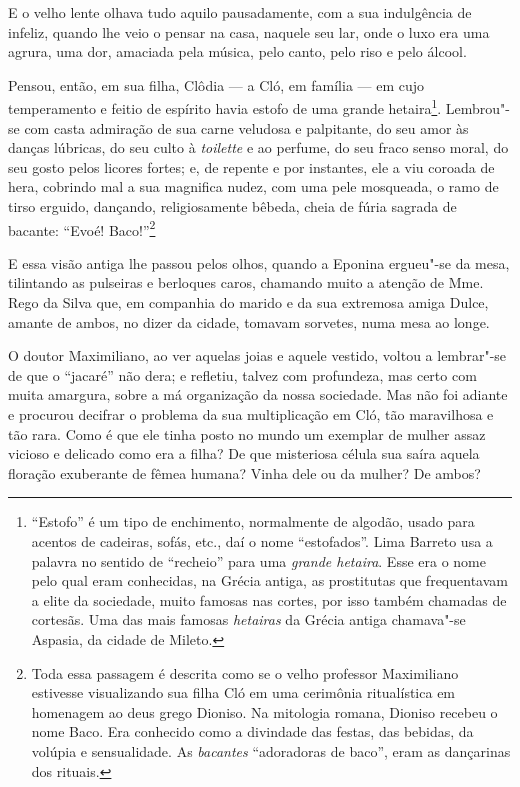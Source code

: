E o velho lente olhava tudo aquilo pausadamente, com a sua indulgência
de infeliz, quando lhe veio o pensar na casa, naquele seu lar, onde o
luxo era uma agrura, uma dor, amaciada pela música, pelo canto, pelo
riso e pelo álcool.

Pensou, então, em sua filha, Clôdia --- a Cló, em família --- em cujo
temperamento e feitio de espírito havia estofo de uma grande
hetaira\footnote{``Estofo'' é um tipo de enchimento, normalmente de
  algodão, usado para acentos de cadeiras, sofás, etc., daí o nome
  ``estofados''. Lima Barreto usa a palavra no sentido de ``recheio''
  para uma \emph{grande hetaira}. Esse era o nome pelo qual eram
  conhecidas, na Grécia antiga, as prostitutas que frequentavam a elite
  da sociedade, muito famosas nas cortes, por isso também chamadas de
  cortesãs. Uma das mais famosas \emph{hetairas} da Grécia antiga
  chamava"-se Aspasia, da cidade de Mileto.}. Lembrou"-se com casta
admiração de sua carne veludosa e palpitante, do seu amor às danças
lúbricas, do seu culto à \emph{toilette} e ao perfume, do seu fraco
senso moral, do seu gosto pelos licores fortes; e, de repente e por
instantes, ele a viu coroada de hera, cobrindo mal a sua magnifica
nudez, com uma pele mosqueada, o ramo de tirso erguido, dançando,
religiosamente bêbeda, cheia de fúria sagrada de bacante: ``Evoé!
Baco!''\footnote{Toda essa passagem é descrita como se o velho professor
  Maximiliano estivesse visualizando sua filha Cló em uma cerimônia
  ritualística em homenagem ao deus grego Dioniso. Na mitologia romana,
  Dioniso recebeu o nome Baco. Era conhecido como a divindade das
  festas, das bebidas, da volúpia e sensualidade. As \emph{bacantes}
  ``adoradoras de baco'', eram as dançarinas dos rituais.}

E essa visão antiga lhe passou pelos olhos, quando a Eponina ergueu"-se
da mesa, tilintando as pulseiras e berloques caros, chamando muito a
atenção de Mme. Rego da Silva que, em companhia do marido e da sua
extremosa amiga Dulce, amante de ambos, no dizer da cidade, tomavam
sorvetes, numa mesa ao longe.

O doutor Maximiliano, ao ver aquelas joias e aquele vestido, voltou a
lembrar"-se de que o ``jacaré'' não dera; e refletiu, talvez com
profundeza, mas certo com muita amargura, sobre a má organização da
nossa sociedade. Mas não foi adiante e procurou decifrar o problema da
sua multiplicação em Cló, tão maravilhosa e tão rara. Como é que ele
tinha posto no mundo um exemplar de mulher assaz vicioso e delicado como
era a filha? De que misteriosa célula sua saíra aquela floração
exuberante de fêmea humana? Vinha dele ou da mulher? De ambos?

